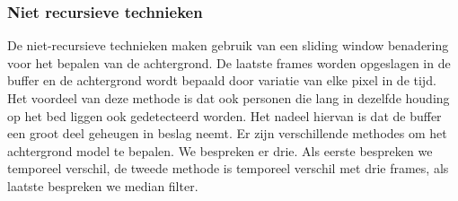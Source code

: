 \subsubsection{Niet recursieve technieken}
\label{refNRT}
De niet-recursieve technieken maken gebruik van een sliding window benadering voor het bepalen van de achtergrond. De laatste frames worden opgeslagen in de buffer en de achtergrond wordt bepaald door variatie van elke pixel in de tijd. Het voordeel van deze methode is dat ook personen die lang in dezelfde houding op het bed liggen ook gedetecteerd worden. Het nadeel hiervan is dat de buffer een groot deel geheugen in beslag neemt. Er zijn verschillende methodes om het achtergrond model te bepalen. We bespreken er drie. Als eerste bespreken we temporeel verschil, de tweede methode is temporeel verschil met drie frames, als laatste bespreken we median filter.

